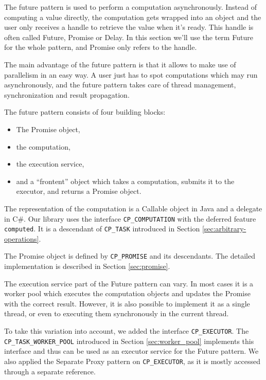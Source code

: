 The future pattern is used to perform a computation asynchronously.
Instead of computing a value directly, the computation gets wrapped into an object and the user only receives a handle to retrieve the value when it's ready.
This handle is often called Future, Promise or Delay.
In this section we'll use the term Future for the whole pattern, and Promise only refers to the handle.

The main advantage of the future pattern is that it allows to make use of parallelism in an easy way.
A user just has to spot computations which may run asynchronously, and the future pattern takes care of thread management, synchronization and result propagation.

The future pattern consists of four building blocks:
\begin{itemize}
 \item The Promise object,
 \item the computation,
 \item the execution service,
 \item and a ``frontent'' object which takes a computation, submits it to the executor, and returns a Promise object.
\end{itemize}

The representation of the computation is a Callable object in Java and a delegate in C\#.
Our library uses the interface \lstinline!CP_COMPUTATION! with the deferred feature \lstinline!computed!.
It is a descendant of \lstinline!CP_TASK! introduced in Section \ref{sec:arbitrary-operations}.

The Promise object is defined by \lstinline!CP_PROMISE! and its descendants.
The detailed implementation is described in Section \ref{sec:promise}.

The execution service part of the Future pattern can vary.
In most cases it is a worker pool which executes the computation objects and updates the Promise with the correct result.
However, it is also possible to implement it as a single thread, or even to executing them synchronously in the current thread.

To take this variation into account, we added the interface \lstinline!CP_EXECUTOR!.
The \lstinline!CP_TASK_WORKER_POOL! introduced in Section \ref{sec:worker_pool} implements this interface and thus can be used as an executor service for the Future pattern.
We also applied the Separate Proxy pattern on \lstinline!CP_EXECUTOR!, as it is mostly accessed through a separate reference.


